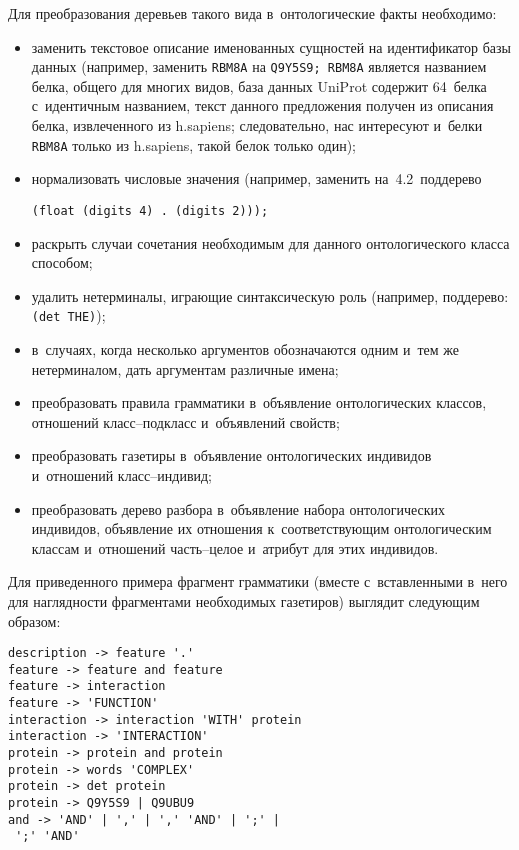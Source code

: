 \begin{multicols}{2}
\begin{figure*}[b]
\begin{center}
{  }
  
  \vspace*{5pt}
  
  \end{center}
  \end{figure*}
  
  Для преобразования деревьев такого вида в~онтологические факты 
необходимо:
  \begin{itemize}
\item заменить текстовое описание именованных сущностей на 
идентификатор базы данных (например, заменить \verb"RBM8A" на 
\verb"Q9Y5S9; RBM8A" является названием белка, общего для многих 
видов, база данных UniProt содержит 64~белка с~идентичным названием, 
текст данного предложения получен из описания белка, извлеченного из 
h.sapiens; следовательно, нас интересуют и~белки \verb"RBM8A" только из 
h.sapiens, такой белок только один);
\item нормализовать числовые значения (например, заменить 
на~4.2~поддерево 
\begin{verbatim}
(float (digits 4) . (digits 2)));
\end{verbatim}
\item раскрыть случаи сочетания необходимым для данного онтологического 
класса способом;
\item удалить нетерминалы, играющие синтаксическую роль (например, 
поддерево: \verb"(det THE)");
\item в~случаях, когда несколько аргументов обозначаются одним и~тем же 
нетерминалом, дать аргументам различные имена;
\item преобразовать правила грамматики в~объявление онтологических 
классов, отношений класс--под\-класс и~объявлений свойств;
\item преобразовать газетиры в~объявление онтологических индивидов и~отношений класс--ин\-дивид;
\item преобразовать дерево разбора в~объявление набора онтологических 
индивидов, объявление их отношения к~соответствующим онтологическим 
классам и~отношений часть--це\-лое и~атрибут для этих индивидов.
\end{itemize}

  Для приведенного примера фрагмент грамматики (вместе с~вставленными 
  в~него для на\-гляд\-ности фрагментами необходимых газетиров) выглядит 
следующим образом:

        \vspace*{-2pt}
        
        \noindent
  \begin{verbatim}
description -> feature '.'
feature -> feature and feature
feature -> interaction
feature -> 'FUNCTION'
interaction -> interaction 'WITH' protein
interaction -> 'INTERACTION'
protein -> protein and protein
protein -> words 'COMPLEX'
protein -> det protein
protein -> Q9Y5S9 | Q9UBU9
and -> 'AND' | ',' | ',' 'AND' | ';' |
 ';' 'AND'
        \end{verbatim}
        

\end{multicols}

